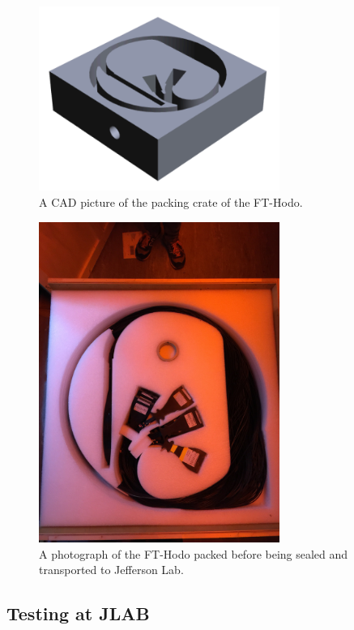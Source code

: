 \begin{figure}
	\centering
	\includegraphics[width=0.7\textwidth]{ImgChap1/packingCAD}
	\caption{A CAD picture of the packing crate of the FT-Hodo.}		
	\label{packingcad}
\end{figure}

\begin{figure}
	\centering
	\includegraphics[width=0.7\textwidth]{ImgChap1/detectorpacked}
	\caption{A photograph of the FT-Hodo packed before being sealed and transported to Jefferson Lab.}		
	\label{packedphoto}
\end{figure}



\subsection{Testing at JLAB}

